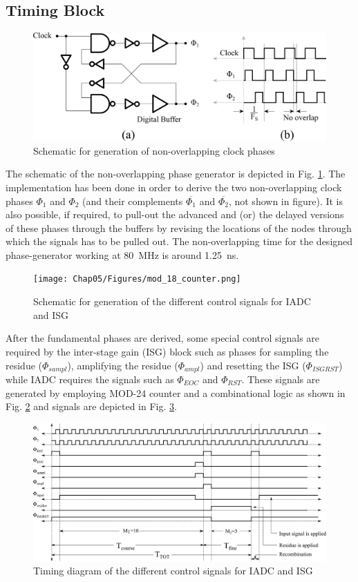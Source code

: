 \subsection{Timing Block}
%
\begin{figure}[h!]
\centering
\includegraphics[width=\columnwidth]{Chap05/Figures/timing_circuit_phases.png}
\caption{Schematic for generation of non-overlapping clock phases}
\label{fig:clk_phase_circuit}
\end{figure}
%
The schematic of the non-overlapping phase generator is depicted in Fig. \ref{fig:clk_phase_circuit}. The implementation has been done in order to derive the two non-overlapping clock phases $\Phi_1$ and $\Phi_2$ (and their complements $\overline{\Phi_1}$ and $\overline{\Phi_2}$, not shown in figure). It is also possible, if required, to pull-out the advanced and (or) the delayed versions of these phases through the buffers by revising the locations of the nodes through which the signals has to be pulled out. The non-overlapping time for the designed phase-generator working at 80~MHz is around 1.25~ns. 
%
\begin{figure}[h!]
\centering
\texttt{[image: Chap05/Figures/mod\_18\_counter.png]}
\caption{Schematic for generation of the different control signals for IADC and ISG}
\label{fig:cntrl_sigs}
\end{figure}
%
After the fundamental phases are derived, some special control signals are required by the inter-stage gain (ISG) block such as phases for sampling the residue ($\Phi_{sampl}$), amplifying the residue ($\Phi_{ampl}$) and resetting the ISG ($\Phi_{ISGRST}$) while IADC requires the signals such as $\Phi_{EOC}$ and $\Phi_{RST}$.
These signals are generated by employing MOD-24 counter and a combinational logic as shown in Fig. \ref{fig:cntrl_sigs} and signals are depicted in Fig. \ref{fig:timing_cntrl_sigs}. 
%
\begin{figure}[h!]
\centering
\includegraphics[width=\columnwidth]{Chap05/Figures/timing_control_phases.png}
\caption{Timing diagram of the different control signals for IADC and ISG}
\label{fig:timing_cntrl_sigs}
\end{figure}
%
